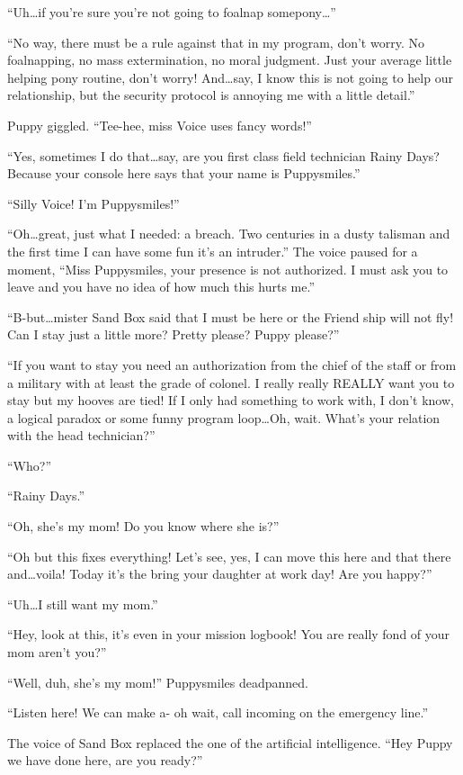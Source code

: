 ``Uh\dots if you're sure you're not going to foalnap somepony\dots''

``No way, there must be a rule against that in my program, don't worry. No foalnapping, no mass extermination, no moral judgment. Just your average little helping pony routine, don't worry! And\dots say, I know this is not going to help our relationship, but the security protocol is annoying me with a little detail.''

Puppy giggled. ``Tee-hee, miss Voice uses fancy words!''

``Yes, sometimes I do that\dots say, are you first class field technician Rainy Days? Because your console here says that your name is Puppysmiles.''

``Silly Voice! I'm Puppysmiles!''

``Oh\dots great, just what I needed: a breach. Two centuries in a dusty talisman and the first time I can have some fun it's an intruder.'' The voice paused for a moment, ``Miss Puppysmiles, your presence is not authorized. I must ask you to leave and you have no idea of how much this hurts me.''

``B-but\dots mister Sand Box said that I must be here or the Friend ship will not fly! Can I stay just a little more? Pretty please? Puppy please?''

``If you want to stay you need an authorization from the chief of the staff or from a military with at least the grade of colonel. I really really REALLY want you to stay but my hooves are tied! If I only had something to work with, I don't know, a logical paradox or some funny program loop\dots Oh, wait. What's your relation with the head technician?''

``Who?''

``Rainy Days.''

``Oh, she's my mom! Do you know where she is?''

``Oh but this fixes everything! Let's see, yes, I can move this here and that there and\dots voila! Today it's the bring your daughter at work day! Are you happy?''

``Uh\dots I still want my mom.''

``Hey, look at this, it's even in your mission logbook! You are really fond of your mom aren't you?''

``Well, duh, she's my mom!'' Puppysmiles deadpanned.

``Listen here! We can make a- oh wait, call incoming on the emergency line.''

The voice of Sand Box replaced the one of the artificial intelligence. ``Hey Puppy we have done here, are you ready?''

